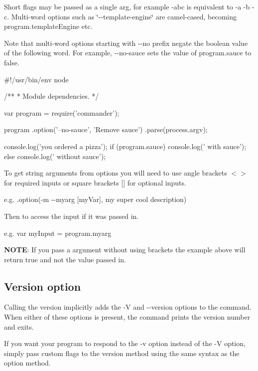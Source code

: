 Short flags may be passed as a single arg, for example {\ttfamily -\/abc} is equivalent to {\ttfamily -\/a -\/b -\/c}. Multi-\/word options such as \char`\"{}-\/-\/template-\/engine\char`\"{} are camel-\/cased, becoming {\ttfamily program.\+template\+Engine} etc.

Note that multi-\/word options starting with {\ttfamily -\/-\/no} prefix negate the boolean value of the following word. For example, {\ttfamily -\/-\/no-\/sauce} sets the value of {\ttfamily program.\+sauce} to false.


\begin{DoxyCode}
#!/usr/bin/env node

/**
 * Module dependencies.
 */

var program = require('commander');

program
  .option('--no-sauce', 'Remove sauce')
  .parse(process.argv);

console.log('you ordered a pizza');
if (program.sauce) console.log('  with sauce');
else console.log(' without sauce');
\end{DoxyCode}


To get string arguments from options you will need to use angle brackets $<$$>$ for required inputs or square brackets \mbox{[}\mbox{]} for optional inputs.

e.\+g. {\ttfamily .option(\textquotesingle{}-\/m -\/-\/myarg \mbox{[}my\+Var\mbox{]}\textquotesingle{}, \textquotesingle{}my super cool description\textquotesingle{})}

Then to access the input if it was passed in.

e.\+g. {\ttfamily var my\+Input = program.\+myarg}

{\bfseries N\+O\+TE}\+: If you pass a argument without using brackets the example above will return true and not the value passed in.

\subsection*{Version option}

Calling the {\ttfamily version} implicitly adds the {\ttfamily -\/V} and {\ttfamily -\/-\/version} options to the command. When either of these options is present, the command prints the version number and exits. 


If you want your program to respond to the {\ttfamily -\/v} option instead of the {\ttfamily -\/V} option, simply pass custom flags to the {\ttfamily version} method using the same syntax as the {\ttfamily option} method.


